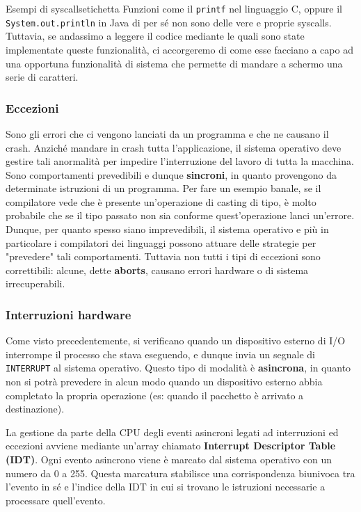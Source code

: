 \documentclass[12pt]{report}
\begin{document}
	\begin{osservazione}{Esempi di syscalls}{etichetta}
		Funzioni come il \texttt{printf} nel linguaggio C, oppure il \texttt{System.out.println} in Java di per sé non sono delle vere e proprie syscalls. Tuttavia, se andassimo a leggere il codice mediante le quali sono state implementate queste funzionalità, ci accorgeremo di come esse facciano a capo ad una opportuna funzionalità di sistema che permette di mandare a schermo una serie di caratteri.
	\end{osservazione}
	
	\subsubsection{Eccezioni}
	Sono gli errori che ci vengono lanciati da un programma e che ne causano il crash. Anziché mandare in crash tutta l'applicazione, il sistema operativo deve gestire tali anormalità per impedire l'interruzione del lavoro di tutta la macchina.
	Sono comportamenti prevedibili e dunque \textbf{sincroni}, in quanto provengono da determinate istruzioni di un programma. Per fare un esempio banale, se il compilatore vede che è presente un'operazione di casting di tipo, è molto probabile che se il tipo passato non sia conforme quest'operazione lanci un'errore. Dunque, per quanto spesso siano imprevedibili, il sistema operativo e più in particolare i compilatori dei linguaggi possono attuare delle strategie per "prevedere" tali comportamenti.
	Tuttavia non tutti i tipi di eccezioni sono correttibili: alcune, dette \textbf{aborts}, causano errori hardware o di sistema irrecuperabili.
	
	\subsubsection{Interruzioni hardware}
	Come visto precedentemente, si verificano quando un dispositivo esterno di I/O interrompe il processo che stava eseguendo, e dunque invia un segnale di \texttt{INTERRUPT} al sistema operativo.
	Questo tipo di modalità è \textbf{asincrona}, in quanto non si potrà prevedere in alcun modo quando un dispositivo esterno abbia completato la propria operazione (es: quando il pacchetto è arrivato a destinazione).
	
	La gestione da parte della CPU degli eventi asincroni legati ad interruzioni ed eccezioni avviene mediante un'array chiamato \textbf{Interrupt Descriptor Table (IDT)}.
	Ogni evento asincrono viene è marcato dal sistema operativo con un numero da 0 a 255. Questa marcatura stabilisce una corrispondenza biunivoca tra l'evento in sé e l'indice della IDT in cui si trovano le istruzioni necessarie a processare quell'evento.
	
\end{document}
